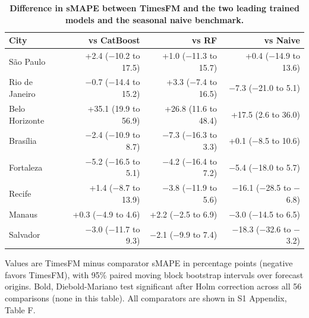 
\begin{table}[!ht]
\centering
\small
\caption{\textbf{Difference in sMAPE between TimesFM and the two leading trained models and the seasonal naive benchmark.}}
\begin{tabular}{lrrr}
\toprule
City & vs CatBoost & vs RF & vs Naive \\
\midrule
S\~ao Paulo & +2.4 ($-$10.2 to 17.5) & +1.0 ($-$11.3 to 15.7) & +0.4 ($-$14.9 to 13.6) \\
Rio de Janeiro & $-$0.7 ($-$14.4 to 15.2) & +3.3 ($-$7.4 to 16.5) & $-$7.3 ($-$21.0 to 5.1) \\
Belo Horizonte & +35.1 (19.9 to 56.9) & +26.8 (11.6 to 48.4) & +17.5 (2.6 to 36.0) \\
Bras\'ilia & $-$2.4 ($-$10.9 to 8.7) & $-$7.3 ($-$16.3 to 3.3) & +0.1 ($-$8.5 to 10.6) \\
Fortaleza & $-$5.2 ($-$16.5 to 5.1) & $-$4.2 ($-$16.4 to 7.2) & $-$5.4 ($-$18.0 to 5.7) \\
Recife & +1.4 ($-$8.7 to 13.9) & $-$3.8 ($-$11.9 to 5.6) & $-$16.1 ($-$28.5 to $-$6.8) \\
Manaus & +0.3 ($-$4.9 to 4.6) & +2.2 ($-$2.5 to 6.9) & $-$3.0 ($-$14.5 to 6.5) \\
Salvador & $-$3.0 ($-$11.7 to 9.3) & $-$2.1 ($-$9.9 to 7.4) & $-$18.3 ($-$32.6 to $-$3.2) \\
\bottomrule
\end{tabular}
\begin{flushleft} Values are TimesFM minus comparator sMAPE in percentage points (negative favors TimesFM), with 95\% paired moving block bootstrap intervals over forecast origins. Bold, Diebold-Mariano test significant after Holm correction across all 56 comparisons (none in this table). All comparators are shown in S1 Appendix, Table F.
\end{flushleft}
\label{table4}
\end{table}
